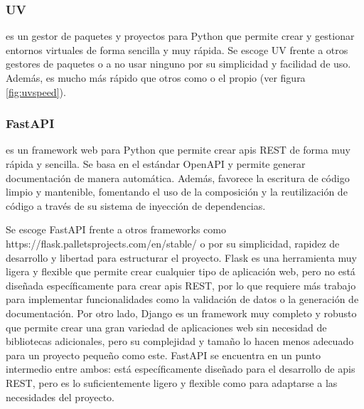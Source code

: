 
\subsubsection{UV}
\label{c08:subsubsec:uv}
 es un gestor de paquetes y proyectos para Python que permite
crear y gestionar entornos virtuales de forma sencilla y muy rápida. Se escoge UV frente a otros gestores
de paquetes o a no usar ninguno por su simplicidad y facilidad de uso. Además, es mucho más rápido que
otros como  o el propio 
(ver figura \ref{fig:uvspeed}).


\subsubsection{FastAPI}
\label{c08:subsubsec:fastapi}
 es un \gls{framework} web para Python que permite crear
\glspl{api} REST de forma muy rápida y sencilla. Se basa en el estándar OpenAPI y permite generar documentación de
manera automática. Además, favorece la escritura de código limpio y mantenible, fomentando el uso de
la composición y la reutilización de código a través de su sistema de inyección de dependencias.

Se escoge FastAPI frente a otros \glspl{framework} como 
{https://flask.palletsprojects.com/en/stable/} o  por
su simplicidad, rapidez de desarrollo y libertad para estructurar el proyecto. Flask es una herramienta
muy ligera y flexible que permite crear cualquier tipo de aplicación web, pero no está diseñada
específicamente para crear \glspl{api} REST, por lo que requiere más trabajo para implementar funcionalidades
como la validación de datos o la generación de documentación. Por otro lado, Django es un \gls{framework}
muy completo y robusto que permite crear una gran variedad de aplicaciones web sin necesidad de
bibliotecas adicionales, pero su complejidad y tamaño lo hacen menos adecuado para un proyecto
pequeño como este. FastAPI se encuentra en un punto intermedio entre ambos: está específicamente
diseñado para el desarrollo de \glspl{api} REST, pero es lo suficientemente ligero y flexible
como para adaptarse a las necesidades del proyecto.

